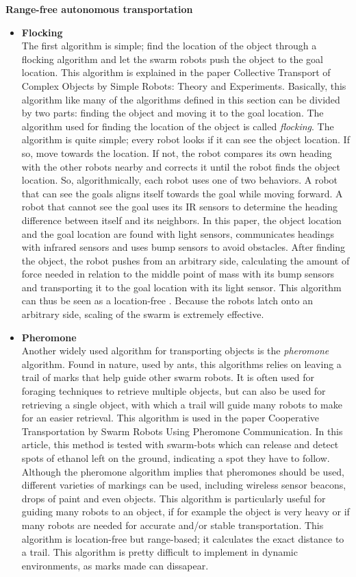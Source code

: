 \textbf{Range-free autonomous transportation}
\begin{itemize} 
\item \textbf{Flocking}\\
The first algorithm is simple; find the location of the object through a flocking algorithm and let the swarm robots push the object to the goal location. 
This algorithm is explained in the paper Collective Transport of Complex Objects by Simple Robots: Theory and Experiments. \cite{Rubenstein2013}
Basically, this algorithm like many of the algorithms defined in this section can be divided by two parts: finding the object and moving it to the goal location.
The algorithm used for finding the location of the object is called \emph{flocking}. The algorithm is quite simple; every robot looks if it can see the object location. If so, move towards the location. If not, the robot compares its own heading with the other robots nearby and corrects it until the robot finds the object location.
So, algorithmically, each robot uses one of two behaviors. A robot that can see the goals aligns itself towards the goal while moving forward. A robot that cannot see the goal uses its IR sensors to determine the heading difference between itself and its neighbors. In this paper, the object location and the goal location are found with light sensors, communicates headings with infrared sensors and uses bump sensors to avoid obstacles. After finding the object, the robot pushes from an arbitrary side, calculating the amount of force needed in relation to the middle point of mass with its bump sensors and transporting it to the goal location with its light sensor.  This algorithm can thus be seen as a location-free .  Because the robots latch onto an arbitrary side, scaling of the swarm is extremely effective. \\ 

\item \textbf{Pheromone}\\
Another widely used algorithm for transporting objects is the \emph{pheromone} algorithm. Found in nature, used by ants, this algorithms relies on leaving a trail of marks that help guide other swarm robots. It is often used for foraging techniques to retrieve multiple objects, but can also be used for retrieving a single object, with which  a trail will guide many robots to make for an easier retrieval. This algorithm is used in the paper Cooperative Transportation by Swarm Robots Using Pheromone Communication. \cite{Fujisawa2013} In this article, this method is tested with swarm-bots which can release and detect spots of ethanol left on the ground, indicating a spot they have to follow. Although the pheromone algorithm implies that pheromones should be used, different varieties of markings can be used, including wireless sensor beacons, drops of paint and even objects. This algorithm is particularly useful for guiding many robots to an object, if for example the object is very heavy or if many robots are needed for accurate and/or stable transportation. This algorithm is location-free but range-based; it calculates the exact distance to a trail. This algorithm is pretty difficult to implement in dynamic environments, as marks made can dissapear. \\


\end{itemize}
